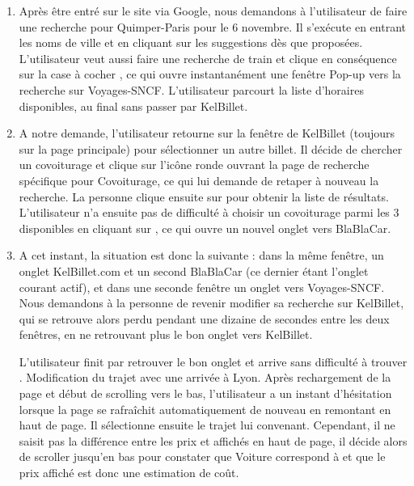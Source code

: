 \begin{enumerate}
\item Apr\`{e}s \^{e}tre entr\'{e} sur le site via Google, nous demandons \`{a} l'utilisateur de faire une recherche pour Quimper-Paris pour le 6 novembre. Il s'ex\'{e}cute en entrant les noms de ville et en cliquant sur les suggestions d\`{e}s que propos\'{e}es. L'utilisateur veut aussi faire une recherche de train et clique en cons\'{e}quence sur la case \`{a} cocher , ce qui ouvre instantan\'{e}ment une fen\^{e}tre Pop-up vers la recherche sur Voyages-SNCF. L'utilisateur parcourt la liste d'horaires disponibles, au final sans passer par KelBillet.


\item A notre demande, l'utilisateur retourne sur la fen\^{e}tre de KelBillet (toujours sur la page principale) pour s\'{e}lectionner un autre billet. Il d\'{e}cide de chercher un covoiturage et clique sur l'ic\^{o}ne ronde  ouvrant la page de recherche sp\'{e}cifique pour Covoiturage, ce qui lui demande de retaper \`{a} nouveau la recherche. La personne clique ensuite sur  pour obtenir la liste de r\'{e}sultats. L'utilisateur n'a ensuite pas de difficult\'{e} \`{a} choisir un covoiturage parmi les 3 disponibles en cliquant sur , ce qui ouvre un nouvel onglet vers BlaBlaCar.


\item A cet instant, la situation est donc la suivante : dans la m\^{e}me fen\^{e}tre, un onglet KelBillet.com et un second  BlaBlaCar (ce dernier \'{e}tant l'onglet courant actif), et dans une seconde fen\^{e}tre un onglet vers Voyages-SNCF. Nous demandons \`{a} la personne de revenir modifier sa recherche sur KelBillet, qui se retrouve alors perdu pendant une dizaine de secondes entre les deux fen\^{e}tres, en ne retrouvant plus le bon onglet vers KelBillet. 

L'utilisateur finit par retrouver le bon onglet et arrive sans difficult\'{e} \`{a} trouver . Modification du trajet avec une arriv\'{e}e \`{a} Lyon. Apr\`{e}s rechargement de la page et d\'{e}but de scrolling vers le bas, l'utilisateur a un instant d'h\'{e}sitation lorsque la page se rafra\^{i}chit automatiquement de nouveau en remontant en haut de page. Il s\'{e}lectionne ensuite le trajet lui convenant. Cependant, il ne saisit pas la diff\'{e}rence entre les prix  et  affich\'{e}s en haut de page, il d\'{e}cide alors de scroller jusqu'en bas pour constater que Voiture correspond \`{a}  et que le prix affich\'{e} est donc une estimation de co\^{u}t.



\end{enumerate}
